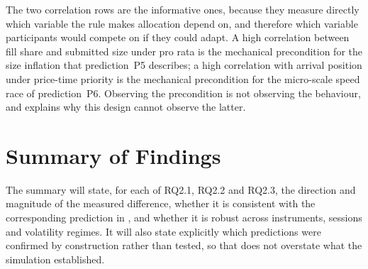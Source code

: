 The two correlation rows are the informative ones, because they measure
directly which variable the rule makes allocation depend on, and
therefore which variable participants would compete on if they could
adapt. A high correlation between fill share and submitted size under
pro rata is the mechanical precondition for the size inflation that
prediction~P5 describes; a high correlation with arrival position under
price-time priority is the mechanical precondition for the micro-scale
speed race of prediction~P6. Observing the precondition is not observing
the behaviour, and  explains why this design cannot
observe the latter.

\section{Summary of Findings}
\label{sec:res_summary}

 The summary will state,
for each of RQ2.1, RQ2.2 and RQ2.3, the direction and magnitude of the
measured difference, whether it is consistent with the corresponding
prediction in , and whether it is robust across
instruments, sessions and volatility regimes. It will also state
explicitly which predictions were confirmed by construction rather than
tested, so that  does not overstate what the
simulation established.
